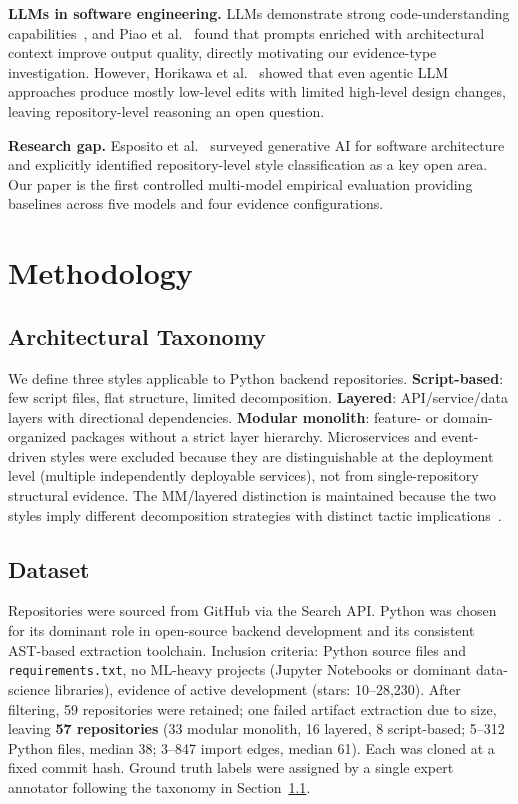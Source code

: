 \documentclass[runningheads]{llncs}
\begin{document}
\textbf{LLMs in software engineering.}
LLMs demonstrate strong code-understanding capabilities~\cite{liu2025exploring}, and Piao et al.~\cite{piao2025refactoring} found that prompts enriched with architectural context improve output quality, directly motivating our evidence-type investigation. However, Horikawa et al.~\cite{horikawa2025agentic} showed that even agentic LLM approaches produce mostly low-level edits with limited high-level design changes, leaving repository-level reasoning an open question.

\textbf{Research gap.}
Esposito et al.~\cite{esposito2025generative} surveyed generative AI for software architecture and explicitly identified repository-level style classification as a key open area. Our paper is the first controlled multi-model empirical evaluation providing baselines across five models and four evidence configurations.

\section{Methodology}
\label{sec:methodology}

\subsection{Architectural Taxonomy}
\label{sec:taxonomy}

We define three styles applicable to Python backend repositories. \textbf{Script-based}: few script files, flat structure, limited decomposition. \textbf{Layered}: API/service/data layers with directional dependencies. \textbf{Modular monolith}: feature- or domain-organized packages without a strict layer hierarchy. Microservices and event-driven styles were excluded because they are distinguishable at the deployment level (multiple independently deployable services), not from single-repository structural evidence. The MM/layered distinction is maintained because the two styles imply different decomposition strategies with distinct tactic implications~\cite{bass2021software}.

\subsection{Dataset}
\label{sec:dataset}

Repositories were sourced from GitHub via the Search API. Python was chosen for its dominant role in open-source backend development and its consistent AST-based extraction toolchain. Inclusion criteria: Python source files and \texttt{requirements.txt}, no ML-heavy projects (Jupyter Notebooks or dominant data-science libraries), evidence of active development (stars: 10--28{,}230). After filtering, 59 repositories were retained; one failed artifact extraction due to size, leaving \textbf{57 repositories} (33 modular monolith, 16 layered, 8 script-based; 5--312 Python files, median 38; 3--847 import edges, median 61). Each was cloned at a fixed commit hash. Ground truth labels were assigned by a single expert annotator following the taxonomy in Section~\ref{sec:taxonomy}.
\end{document}

